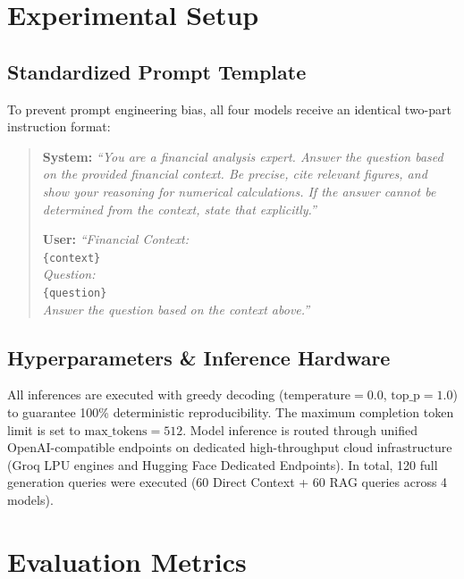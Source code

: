\documentclass[11pt]{article}
\begin{document}
\section{Experimental Setup}
\label{sec:setup}

\subsection{Standardized Prompt Template}
To prevent prompt engineering bias, all four models receive an identical two-part instruction format:
\begin{quote}
\small
\textbf{System:} \textit{``You are a financial analysis expert. Answer the question based on the provided financial context. Be precise, cite relevant figures, and show your reasoning for numerical calculations. If the answer cannot be determined from the context, state that explicitly.''}

\textbf{User:} \textit{``Financial Context:}\\
\texttt{\{context\}}\\
\textit{Question:}\\
\texttt{\{question\}}\\
\textit{Answer the question based on the context above.''}
\end{quote}

\subsection{Hyperparameters \& Inference Hardware}
All inferences are executed with greedy decoding ($\text{temperature} = 0.0$, $\text{top\_p} = 1.0$) to guarantee 100\% deterministic reproducibility. The maximum completion token limit is set to $\text{max\_tokens} = 512$. Model inference is routed through unified OpenAI-compatible endpoints on dedicated high-throughput cloud infrastructure (Groq LPU engines and Hugging Face Dedicated Endpoints). In total, 120 full generation queries were executed (60 Direct Context + 60 RAG queries across 4 models).

\section{Evaluation Metrics}
\label{sec:metrics}
\end{document}
